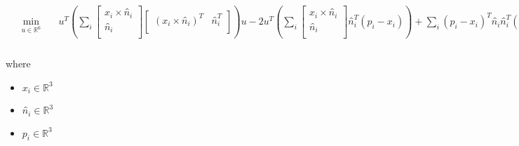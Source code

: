 \documentclass[12pt]{article}
\begin{document}
\begin{align*}
 & \begin{aligned} \min_{\textit{u} \in \mathbb{R}^{ 6}} \quad & \textit{u}^T\left( \sum_\textit{i} \begin{bmatrix}
\textit{x}_{ \textit{i} } × \textit{n̂}_{ \textit{i} }\\
\textit{n̂}_{ \textit{i} }\\
\end{bmatrix}\begin{bmatrix}
\left( \textit{x}_{ \textit{i} } × \textit{n̂}_{ \textit{i} } \right)^T & \textit{n̂}_{ \textit{i} }^T\\
\end{bmatrix} \right)\textit{u} - 2\textit{u}^T\left( \sum_\textit{i} \begin{bmatrix}
\textit{x}_{ \textit{i} } × \textit{n̂}_{ \textit{i} }\\
\textit{n̂}_{ \textit{i} }\\
\end{bmatrix}\textit{n̂}_{ \textit{i} }^T\left( \textit{p}_{ \textit{i} } - \textit{x}_{ \textit{i} } \right) \right) + \sum_\textit{i} \left( \textit{p}_{ \textit{i} } - \textit{x}_{ \textit{i} } \right)^T\textit{n̂}_{ \textit{i} }\textit{n̂}_{ \textit{i} }^T\left( \textit{p}_{ \textit{i} } - \textit{x}_{ \textit{i} } \right) \\
\end{aligned}
\end{align*}

where
\begin{itemize}
\item $\textit{x}_{\textit{i}} \in \mathbb{R}^{ 3}$
\item $\textit{n̂}_{\textit{i}} \in \mathbb{R}^{ 3}$
\item $\textit{p}_{\textit{i}} \in \mathbb{R}^{ 3}$
\end{itemize}
\end{document}
